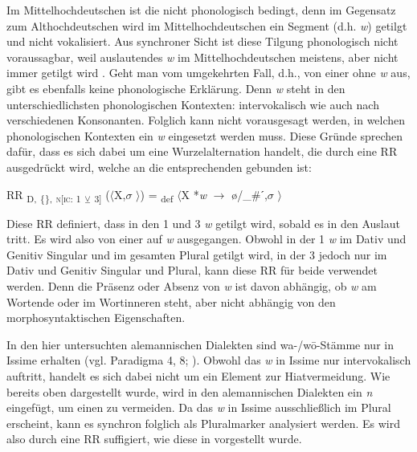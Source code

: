 Im Mittelhochdeutschen ist die  nicht phonologisch bedingt, denn im Gegensatz zum Althochdeutschen wird im Mittelhochdeutschen ein Segment (d.h. \textit{w}) getilgt und nicht vokalisiert. Aus synchroner Sicht ist diese Tilgung phonologisch nicht voraussagbar, weil auslautendes \textit{w} im Mittelhochdeutschen meistens, aber nicht immer getilgt wird \citep[123]{VoylesBarrack2014}. Geht man vom umgekehrten Fall, d.h., von einer  ohne \textit{w} aus, gibt es ebenfalls keine phonologische Erklärung. Denn \textit{w} steht in den unterschiedlichsten phonologischen Kontexten: intervokalisch wie auch nach verschiedenen Konsonanten. Folglich kann nicht vorausgesagt werden, in welchen phonologischen Kontexten ein \textit{w} eingesetzt werden muss. Diese Gründe sprechen dafür, dass es sich dabei um eine Wurzelalternation handelt, die durch eine RR ausgedrückt wird, welche an die entsprechenden  gebunden ist:

\ea%
\label{ex:key:60}
 RR \textsubscript{D,} \textsubscript{\{\},} \textsubscript{\textsc{n[}\textsc{ic:} 1} \textsubscript{\tiny $\veebar$}\textsubscript{ 3]} ($\langle$X,$\sigma$ $\rangle$) = \textsubscript{def} $\langle$X *\textit{w} $\rightarrow$ ø/\_\#ˊ,$\sigma$ $\rangle$\\
\z

Diese RR definiert, dass in den  1 und 3 \textit{w} getilgt wird, sobald es in den Auslaut tritt. Es wird also von einer  auf \textit{w} ausgegangen. Obwohl in der  1 \textit{w} im Dativ und Genitiv Singular und im gesamten Plural getilgt wird, in der  3 jedoch nur im Dativ und Genitiv Singular und Plural, kann diese RR für beide  verwendet werden. Denn die Präsenz oder Absenz von \textit{w} ist davon abhängig, ob \textit{w} am Wortende oder im Wortinneren steht, aber nicht abhängig von den morphosyntaktischen Eigenschaften.

In den hier untersuchten alemannischen Dialekten sind wa-/w\=o-Stäm\-me nur in Issime erhalten (vgl. Paradigma 4,  8; \citealt[163]{Zürrer1999}). Obwohl das \textit{w} in Issime nur intervokalisch auftritt, handelt es sich dabei nicht um ein Element zur Hiatvermeidung. Wie bereits oben dargestellt wurde, wird in den alemannischen Dialekten ein \textit{n} eingefügt, um einen  zu vermeiden. Da das \textit{w} in Issime ausschließlich im Plural erscheint, kann es synchron folglich als Pluralmarker analysiert werden. Es wird also durch eine RR suffigiert, wie diese in  vorgestellt wurde.

